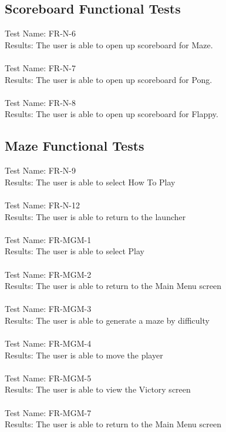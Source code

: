 \documentclass[12pt, titlepage]{article}
\begin{document}
\subsection{Scoreboard Functional Tests}
    Test Name: FR-N-6\\
	Results: The user is able to open up scoreboard for Maze.\\ \\
	Test Name: FR-N-7\\
	Results: The user is able to open up scoreboard for Pong.\\ \\
	Test Name: FR-N-8\\
	Results: The user is able to open up scoreboard for Flappy.\\
	
\subsection{Maze Functional Tests}
	Test Name: FR-N-9 \\
	Results: The user is able to select How To Play \\ \\
	Test Name: FR-N-12 \\
	Results: The user is able to return to the launcher \\ \\
	Test Name: FR-MGM-1 \\
	Results: The user is able to select Play \\ \\
	Test Name: FR-MGM-2 \\
	Results: The user is able to return to the Main Menu screen\\ \\
	Test Name: FR-MGM-3 \\
	Results: The user is able to generate a maze by difficulty \\ \\ 
	Test Name: FR-MGM-4 \\ 
	Results: The user is able to move the player \\ \\
	Test Name: FR-MGM-5 \\
	Results: The user is able to view the Victory screen \\ \\
	Test Name: FR-MGM-7 \\ 
	Results: The user is able to return to the Main Menu screen\\
	
\end{document}
